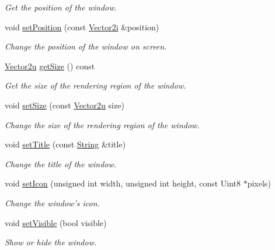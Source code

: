 \begin{DoxyCompactItemize}
\begin{DoxyCompactList}\small\item\em Get the position of the window. \end{DoxyCompactList}\item 
void \hyperlink{classsf_1_1_window_a6c4078bfbf61c29bfc4b4732ce764f17}{set\+Position} (const \hyperlink{classsf_1_1_vector2}{Vector2i} \&position)
\begin{DoxyCompactList}\small\item\em Change the position of the window on screen. \end{DoxyCompactList}\item 
\hyperlink{classsf_1_1_vector2}{Vector2u} \hyperlink{classsf_1_1_window_ad2b55a731ba1680fe67292991ef1610e}{get\+Size} () const 
\begin{DoxyCompactList}\small\item\em Get the size of the rendering region of the window. \end{DoxyCompactList}\item 
void \hyperlink{classsf_1_1_window_ad6513418bb2963347cd1819a1810524d}{set\+Size} (const \hyperlink{classsf_1_1_vector2}{Vector2u} size)
\begin{DoxyCompactList}\small\item\em Change the size of the rendering region of the window. \end{DoxyCompactList}\item 
void \hyperlink{classsf_1_1_window_a3b3f3513bb6be90f5cd456c20b5fd5fa}{set\+Title} (const \hyperlink{classsf_1_1_string}{String} \&title)
\begin{DoxyCompactList}\small\item\em Change the title of the window. \end{DoxyCompactList}\item 
void \hyperlink{classsf_1_1_window_a63af61e026fba08e3153fd013620bcc0}{set\+Icon} (unsigned int width, unsigned int height, const Uint8 $\ast$pixels)
\begin{DoxyCompactList}\small\item\em Change the window's icon. \end{DoxyCompactList}\item 
void \hyperlink{classsf_1_1_window_a160f7f11a207603d7e99ce606e749703}{set\+Visible} (bool visible)
\begin{DoxyCompactList}\small\item\em Show or hide the window. \end{DoxyCompactList}\item 

\end{DoxyCompactItemize}
